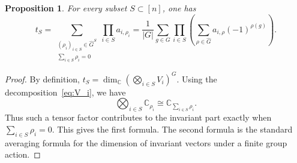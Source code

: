 \documentclass{amsart}
\newtheorem{proposition}[theorem]{Proposition}
\numberwithin{equation}{section}
\theoremstyle{definition}
\theoremstyle{remark}
\newcommand{\C}{\mathbb C}
\begin{document}
\begin{proposition}\label{prop:tS-from-lambda}
    For every subset $S\subset[n]$, one has
    $$
        t_S= \sum_{\substack{(\rho_i)_{i\in S}\in \widehat G^S\\ \sum_{i\in S}\rho_i=0}} \prod_{i\in S} a_{i,\rho_i} = \frac{1}{|G|} \sum_{g\in G} \prod_{i\in S} \left( \sum_{\rho\in \widehat G} a_{i,\rho}(-1)^{\rho(g)} \right).
    $$
\end{proposition}
\begin{proof}
    By definition, $t_S=\dim_\C\left(\bigotimes_{i\in S}V_i\right)^G$.
    Using the decomposition~\eqref{eq:V_i}, we have
    $$
        \bigotimes_{i\in S}\C_{\rho_i}\cong\C_{\sum_{i\in S}\rho_i}.
    $$
    Thus such a tensor factor contributes to the invariant part exactly when $\sum_{i\in S}\rho_i=0$.
    This gives the first formula.
The second formula is the standard averaging formula for the dimension of invariant vectors under a finite group action.
\end{proof}
\end{document}
